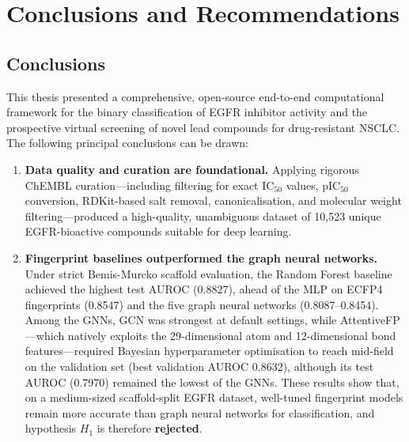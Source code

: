 \chapter{Conclusions and Recommendations}

\section{Conclusions}

This thesis presented a comprehensive, open-source end-to-end computational
framework for the binary classification of EGFR inhibitor activity and the
prospective virtual screening of novel lead compounds for drug-resistant NSCLC.
The following principal conclusions can be drawn:

\begin{enumerate}
    \item \textbf{Data quality and curation are foundational.} Applying rigorous
          ChEMBL curation---including filtering for exact IC$_{50}$ values, pIC$_{50}$
          conversion, RDKit-based salt removal, canonicalisation, and molecular weight
          filtering---produced a high-quality, unambiguous dataset of 10,523 unique
          EGFR-bioactive compounds suitable for deep learning.

    \item \textbf{Fingerprint baselines outperformed the graph neural networks.}
          Under strict Bemis-Murcko scaffold evaluation, the Random Forest baseline
          achieved the highest test AUROC (0.8827), ahead of the MLP on ECFP4
          fingerprints (0.8547) and the five graph neural networks (0.8087--0.8454).
          Among the GNNs, GCN was strongest at default settings, while
          AttentiveFP---which natively exploits the 29-dimensional atom and
          12-dimensional bond features---required Bayesian hyperparameter optimisation
          to reach mid-field on the validation set (best validation AUROC 0.8632),
          although its test AUROC (0.7970) remained the lowest of the GNNs. These
          results show that, on a medium-sized scaffold-split EGFR dataset, well-tuned
          fingerprint models remain more accurate than graph neural networks for
          classification, and hypothesis $H_1$ is therefore \textbf{rejected}.


\end{enumerate}
